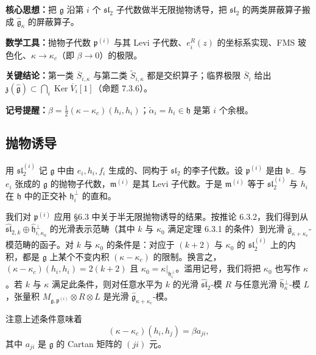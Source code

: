 \begin{keypoints}
    \item \textbf{核心思想：}把 $\mathfrak{g}$ 沿第 $i$ 个 $\mathfrak{sl}_2$ 子代数做半无限抛物诱导，把 $\mathfrak{sl}_2$ 的两类屏蔽算子搬成 $\hat{\mathfrak{g}}_\kappa$ 的屏蔽算子。
    \item \textbf{数学工具：}抛物子代数 $\mathfrak{p}^{(i)}$ 与其 Levi 子代数、$e_i^R(z)$ 的坐标系实现、FMS 玻色化、$\kappa\to\kappa_c$（即 $\beta\to0$）的极限。
    \item \textbf{关键结论：}第一类 $\overline{S}_{i,\kappa}$ 与第二类 $\widetilde{S}_{i,\kappa}$ 都是交织算子；临界极限 $\overline{S}_i$ 给出 $\mathfrak{z}(\hat{\mathfrak{g}})\subset\bigcap_i\operatorname{Ker}\overline{V}_i[1]$（命题 7.3.6）。
    \item \textbf{记号提醒：}$\beta=\frac12(\kappa-\kappa_c)(h_i,h_i)$；$\check{\alpha}_i=h_i\in\mathfrak{h}$ 是第 $i$ 个余根。
\end{keypoints}

\subsection{抛物诱导}

用 $\mathfrak{sl}_2^{(i)}$ 记 $\mathfrak{g}$ 中由 $e_i,h_i,f_i$ 生成的、同构于 $\mathfrak{sl}_2$ 的李子代数。设 $\mathfrak{p}^{(i)}$ 是由 $\mathfrak{b}_-$ 与 $e_i$ 张成的 $\mathfrak{g}$ 的抛物子代数，$\mathfrak{m}^{(i)}$ 是其 Levi 子代数。于是 $\mathfrak{m}^{(i)}$ 等于 $\mathfrak{sl}_2^{(i)}$ 与 $h_i$ 在 $\mathfrak{h}$ 中的正交补 $\mathfrak{h}_i^\perp$ 的直和。

我们对 $\mathfrak{p}^{(i)}$ 应用 §6.3 中关于半无限抛物诱导的结果。按推论 6.3.2，我们得到从 $\widehat{\mathfrak{sl}}_{2,k}\oplus\widehat{\mathfrak{h}}{}_{i,\kappa_0}^{\perp}$ 的光滑表示范畴（其中 $k$ 与 $\kappa_0$ 满足定理 6.3.1 的条件）到光滑 $\hat{\mathfrak{g}}_{\kappa+\kappa_c}$-模范畴的函子。对 $k$ 与 $\kappa_0$ 的条件是：对应于 $(k+2)$ 与 $\kappa_0$ 的 $\mathfrak{sl}_2^{(i)}$ 上的内积，都是 $\mathfrak{g}$ 上某个不变内积 $(\kappa-\kappa_c)$ 的限制。换言之，$(\kappa-\kappa_c)(h_i,h_i)=2(k+2)$ 且 $\kappa_0=\kappa|_{\mathfrak{h}_i^\perp}$。滥用记号，我们将把 $\kappa_0$ 也写作 $\kappa$。若 $k$ 与 $\kappa$ 满足此条件，则对任意水平为 $k$ 的光滑 $\widehat{\mathfrak{sl}}_2$-模 $R$ 与任意光滑 $\widehat{\mathfrak{h}}{}_\kappa^{\perp}$-模 $L$，张量积 $M_{\mathfrak{g},\mathfrak{p}^{(i)}}\otimes R\otimes L$ 是光滑 $\hat{\mathfrak{g}}_{\kappa+\kappa_c}$-模。

注意上述条件意味着
\begin{equation}
    (\kappa-\kappa_c)(h_i,h_j)=\beta a_{ji},
    \tag{7.3-1}
\end{equation}
其中 $a_{ji}$ 是 $\mathfrak{g}$ 的 Cartan 矩阵的 $(ji)$ 元。

